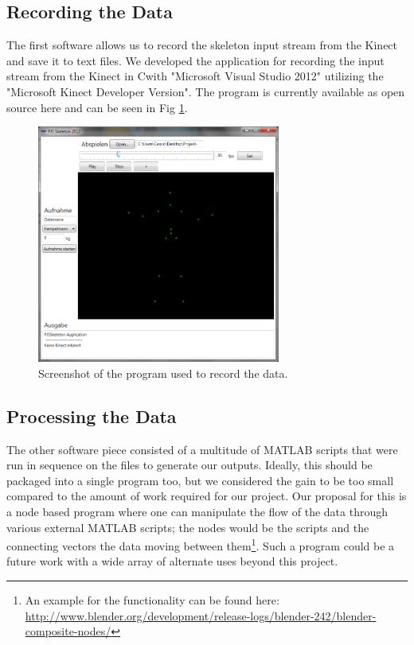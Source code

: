 \documentclass[a4paper]{article}
\newcommand{\CS}{C\nolinebreak\hspace{-.05em}\raisebox{.6ex}{\scriptsize\bf \#\ }}
\begin{document}
\subsection{Recording the Data}

The first software allows us to record the skeleton input stream from the Kinect and save it to text files.
We developed the application for recording the input stream from the Kinect in \CS with "Microsoft Visual Studio 2012" utilizing the "Microsoft Kinect Developer Version".
The program is currently available as open source here \cite{csprogram} and can be seen in Fig \ref{fig:programm}.

\begin{figure}
	\centering
	\includegraphics[width=8cm]{programm.jpg}
	\caption{Screenshot of the program used to record the data.}
	\label{fig:programm}
\end{figure}



\subsection{Processing the Data}

The other software piece consisted of a multitude of MATLAB\cite{matlabprograms} scripts that were run in sequence on the files to generate our outputs.
Ideally, this should be packaged into a single program too, but we considered the gain to be too small compared to the amount of work required for our project.
Our proposal for this is a node based program where one can manipulate the flow of the data through various external MATLAB scripts; the nodes would be the scripts and the connecting vectors the data moving between them\footnote{An example for the functionality can be found here: \url{http://www.blender.org/development/release-logs/blender-242/blender-composite-nodes/}}.
Such a program could be a future work with a wide array of alternate uses beyond this project.
\end{document}
